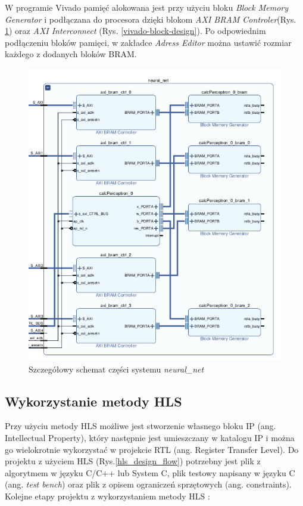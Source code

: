 W programie Vivado pamięć alokowana jest przy użyciu bloku 
\emph{Block Memory Generator} i podłączana do procesora dzięki blokom 
\emph{AXI BRAM Controler}(Rys. \ref{vivado-block-neural}) oraz \emph{AXI Interconnect} 
(Rys. \ref{vivado-block-design}). Po odpowiednim podłączeniu bloków pamięci, w zakładce \emph{Adress Editor} można ustawić rozmiar każdego z dodanych bloków BRAM.

\begin{figure}[!h]
  \centering
  \includegraphics[width=\textwidth]{img/vivado-neuralnet.png}
  \caption{Szczegółowy schemat części systemu \emph{neural\_net}}
  \label{vivado-block-neural}
\end{figure}

\subsection{Wykorzystanie metody HLS}
Przy użyciu metody HLS możliwe jest stworzenie własnego bloku IP (ang. 
Intellectual Property), który następnie jest umieszczany w katalogu IP i można 
go wielokrotnie wykorzystać w projekcie RTL (ang. Register Transfer Level).
Do projektu z użyciem HLS (Rys.\ref{hls_design_flow}) potrzebny jest plik 
z algorytmem w języku C/C++ lub System C, plik testowy napisany w języku C 
(ang. \emph{test bench}) oraz plik z opisem ograniczeń sprzętowych (ang. constraints).
Kolejne etapy projektu z wykorzystaniem metody HLS \cite{hlsXilinxGuide}:

